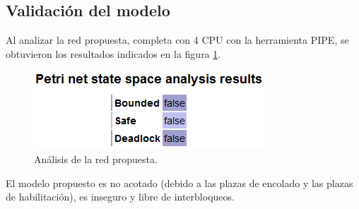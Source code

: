 \documentclass[a4paper]{book}
\begin{document}
\subsection{Validaci\'on del modelo}
Al analizar la red propuesta, completa con 4 CPU con la herramienta PIPE, se obtuvieron los resultados indicados en la figura \ref{Fig:validacion6}.

\begin{figure} [H]
	\begin{center}
        \includegraphics[scale=0.7]{./imagenes/it6validacion.png}
		\caption{An\'alisis de la red propuesta.}
		\label{Fig:validacion6}
	\end{center}
\end{figure}

El modelo propuesto es no acotado (debido a las plazas de encolado y las plazas de habilitaci\'on), es inseguro y libre de interbloqueos.
\end{document}
